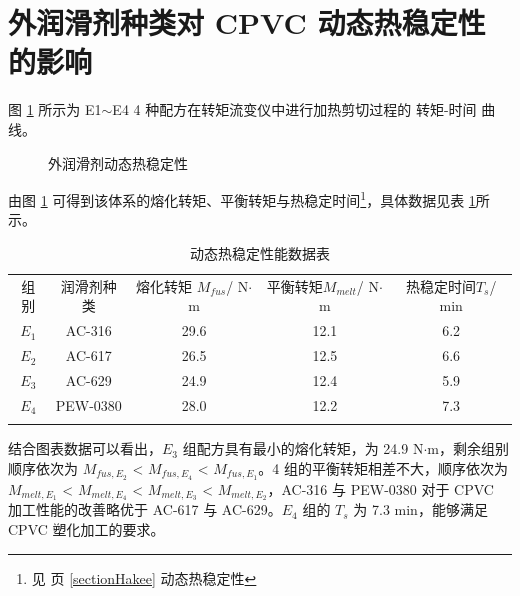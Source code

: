 \section{外润滑剂种类对 CPVC 动态热稳定性的影响}

图 \ref{fig1Hakee} 所示为 E1$\sim$E4 4 种配方在转矩流变仪中进行加热剪切过程的 转矩-时间 曲线。

\begin{figure}[!htbp]
    \begin{center}
        
    \end{center}
    \caption{外润滑剂动态热稳定性}
    \label{fig1Hakee}
\end{figure}

由图 \ref{fig1Hakee} 可得到该体系的熔化转矩、平衡转矩与热稳定时间\footnote{见 \pageref{sectionHakee} 页 \ref{sectionHakee} 动态热稳定性}，具体数据见表 \ref{tab1Hakee}所示。

\begin{table}[!htbp]
    \caption{动态热稳定性能数据表}
    \label{tab1Hakee}
    \begin{center}
    \footnotesize{
        \begin{tabular}{ccccc}
            \Xhline{1pt}
            组别 & 润滑剂种类 & \makecell[c]{熔化转矩 $M_{fus}$/\\N$\cdot$m} & \makecell[c]{平衡转矩$M_{melt}$/\\N$\cdot$m} & \makecell[c]{热稳定时间$T_{s}$/\\min} \\
            \Xhline{0.5pt}
            $E_1$ & AC-316 & 29.6 & 12.1 & 6.2  \\
            $E_2$ & AC-617 & 26.5 & 12.5 & 6.6  \\
            $E_3$ & AC-629 & 24.9 & 12.4 & 5.9  \\
            $E_4$ & PEW-0380 & 28.0 & 12.2 & 7.3    \\
            \Xhline{1pt}
        \end{tabular}
    }
    \end{center}
\end{table}

结合图表数据可以看出，$E_3$ 组配方具有最小的熔化转矩，为 24.9 N$\cdot$m，剩余组别顺序依次为 $M_{fus, E_2}$ < $M_{fus, E_4}$ < $M_{fus, E_1}$。4 组的平衡转矩相差不大，顺序依次为 $M_{melt, E_1}$ < $M_{melt, E_4}$ < $M_{melt, E_3}$ < $M_{melt, E_2}$，AC-316 与 PEW-0380 对于 CPVC 加工性能的改善略优于 AC-617 与 AC-629。$E_4$ 组的 $T_{s}$ 为 7.3 min，能够满足 CPVC 塑化加工的要求。


